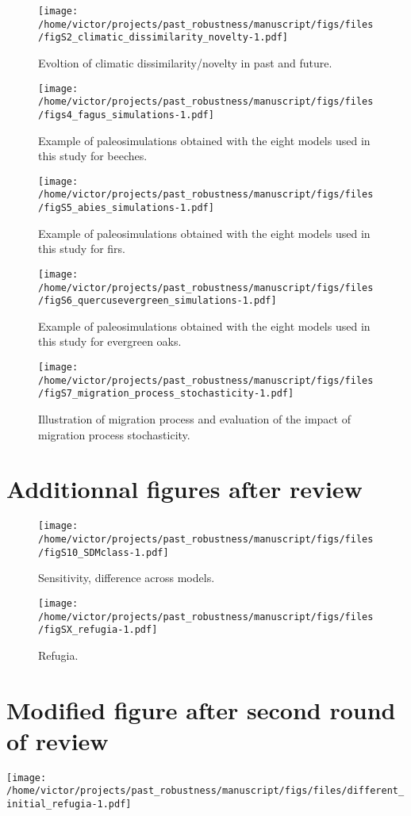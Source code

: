 \documentclass[
]{article}
\begin{document}
\begin{figure}
\centering
\texttt{[image: /home/victor/projects/past\_robustness/manuscript/figs/files/figS2\_climatic\_dissimilarity\_novelty-1.pdf]}
\caption{Evoltion of climatic dissimilarity/novelty in past and future.}
\end{figure}

\begin{figure}
\centering
\texttt{[image: /home/victor/projects/past\_robustness/manuscript/figs/files/figs4\_fagus\_simulations-1.pdf]}
\caption{Example of paleosimulations obtained with the eight models used
in this study for beeches.}
\end{figure}

\begin{figure}
\centering
\texttt{[image: /home/victor/projects/past\_robustness/manuscript/figs/files/figS5\_abies\_simulations-1.pdf]}
\caption{Example of paleosimulations obtained with the eight models used
in this study for firs.}
\end{figure}

\begin{figure}
\centering
\texttt{[image: /home/victor/projects/past\_robustness/manuscript/figs/files/figS6\_quercusevergreen\_simulations-1.pdf]}
\caption{Example of paleosimulations obtained with the eight models used
in this study for evergreen oaks.}
\end{figure}

\begin{figure}
\centering
\texttt{[image: /home/victor/projects/past\_robustness/manuscript/figs/files/figS7\_migration\_process\_stochasticity-1.pdf]}
\caption{Illustration of migration process and evaluation of the impact
of migration process stochasticity.}
\end{figure}

\section{Additionnal figures after
review}\label{additionnal-figures-after-review}

\begin{figure}
\centering
\texttt{[image: /home/victor/projects/past\_robustness/manuscript/figs/files/figS10\_SDMclass-1.pdf]}
\caption{Sensitivity, difference across models.}
\end{figure}

\begin{figure}
\centering
\texttt{[image: /home/victor/projects/past\_robustness/manuscript/figs/files/figSX\_refugia-1.pdf]}
\caption{Refugia.}
\end{figure}

\section{Modified figure after second round of
review}\label{modified-figure-after-second-round-of-review}

\texttt{[image: /home/victor/projects/past\_robustness/manuscript/figs/files/different\_initial\_refugia-1.pdf]}
\end{document}
